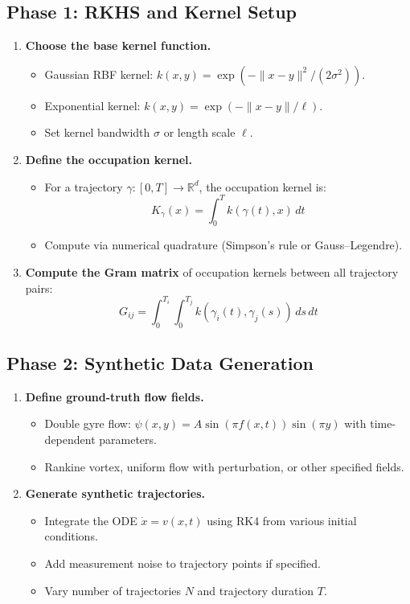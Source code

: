 \documentclass[11pt,a4paper]{article}
\begin{document}
\subsection{Phase 1: RKHS and Kernel Setup}
\begin{enumerate}[label=\textbf{1.\arabic*}]
  \item \textbf{Choose the base kernel function.}
    \begin{itemize}
      \item Gaussian RBF kernel: $k(x, y) = \exp(-\|x-y\|^2 / (2\sigma^2))$.
      \item Exponential kernel: $k(x, y) = \exp(-\|x-y\| / \ell)$.
      \item Set kernel bandwidth $\sigma$ or length scale $\ell$.
    \end{itemize}
  \item \textbf{Define the occupation kernel.}
    \begin{itemize}
      \item For a trajectory $\gamma: [0, T] \to \mathbb{R}^d$, the occupation kernel is:
      \begin{equation*}
        K_\gamma(x) = \int_0^T k(\gamma(t), x) \, dt
      \end{equation*}
      \item Compute via numerical quadrature (Simpson's rule or Gauss--Legendre).
    \end{itemize}
  \item \textbf{Compute the Gram matrix} of occupation kernels between all trajectory pairs:
    \begin{equation*}
      G_{ij} = \int_0^{T_i} \int_0^{T_j} k(\gamma_i(t), \gamma_j(s)) \, ds \, dt
    \end{equation*}
\end{enumerate}

\subsection{Phase 2: Synthetic Data Generation}
\begin{enumerate}[label=\textbf{2.\arabic*}]
  \item \textbf{Define ground-truth flow fields.}
    \begin{itemize}
      \item Double gyre flow: $\psi(x,y) = A \sin(\pi f(x,t)) \sin(\pi y)$ with time-dependent parameters.
      \item Rankine vortex, uniform flow with perturbation, or other specified fields.
    \end{itemize}
  \item \textbf{Generate synthetic trajectories.}
    \begin{itemize}
      \item Integrate the ODE $\dot{x} = v(x,t)$ using RK4 from various initial conditions.
      \item Add measurement noise to trajectory points if specified.
      \item Vary number of trajectories $N$ and trajectory duration $T$.
    \end{itemize}
\end{enumerate}
\end{document}
